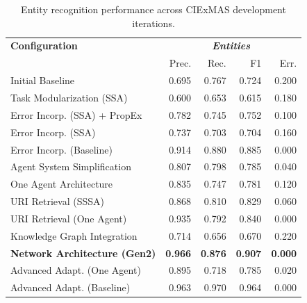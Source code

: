 \documentclass[a4paper,oneside,bibliography=totoc]{scrbook}
\begin{document}
\begin{table}[h]
  \centering
  \begin{tabular}{p{6cm}|rrrr}
    \toprule
    \textbf{Configuration}               & \multicolumn{4}{c}{\textit{\textbf{Entities}}}                                                    \\
                                         & Prec.                                          & Rec.           & F1             & Err.           \\
    \midrule
    Initial Baseline                     & 0.695                                          & 0.767          & 0.724          & 0.200          \\
    Task Modularization (SSA)            & 0.600                                          & 0.653          & 0.615          & 0.180          \\
    Error Incorp. (SSA) + PropEx         & 0.782                                          & 0.745          & 0.752          & 0.100          \\
    Error Incorp. (SSA)                  & 0.737                                          & 0.703          & 0.704          & 0.160          \\
    Error Incorp. (Baseline)             & 0.914                                          & 0.880          & 0.885          & 0.000          \\
    Agent System Simplification          & 0.807                                          & 0.798          & 0.785          & 0.040          \\
    One Agent Architecture               & 0.835                                          & 0.747          & 0.781          & 0.120          \\
    URI Retrieval (SSSA)                 & 0.868                                          & 0.810          & 0.829          & 0.060          \\
    URI Retrieval (One Agent)            & 0.935                                          & 0.792          & 0.840          & 0.000          \\
    Knowledge Graph Integration          & 0.714                                          & 0.656          & 0.670          & 0.220          \\
    \textbf{Network Architecture (Gen2)} & \textbf{0.966}                                 & \textbf{0.876} & \textbf{0.907} & \textbf{0.000} \\
    Advanced Adapt. (One Agent)          & 0.895                                          & 0.718          & 0.785          & 0.020          \\
    Advanced Adapt. (Baseline)           & 0.963                                          & 0.970          & 0.964          & 0.000          \\
    \bottomrule
  \end{tabular}
  \caption{Entity recognition performance across CIExMAS development iterations.}
  \label{tab:evaluation_entities_iterations}
\end{table}
\end{document}
